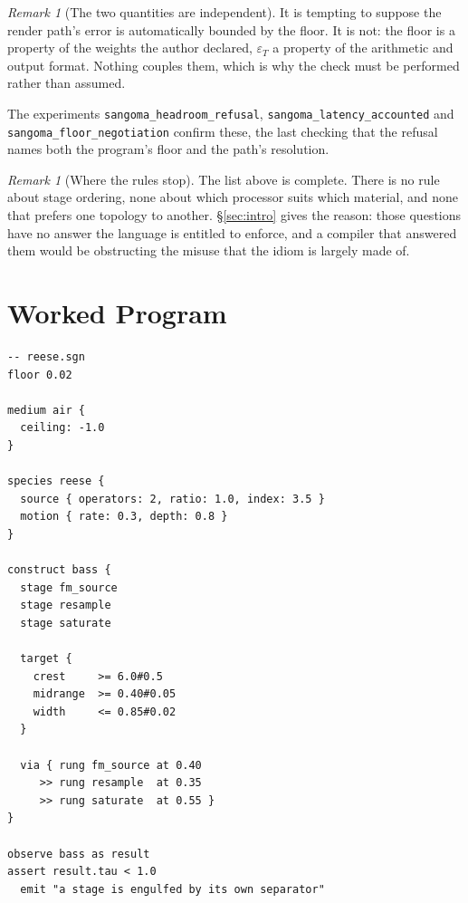 \documentclass[11pt,twocolumn,a4paper]{article}
\theoremstyle{definition}
\theoremstyle{remark}
\newtheorem{remark}[theorem]{Remark}
\begin{document}
\begin{remark}[The two quantities are independent]
\label{rem:indep}
It is tempting to suppose the render path's error is automatically bounded by the
floor. It is not: the floor is a property of the weights the author declared,
$\varepsilon_T$ a property of the arithmetic and output format. Nothing couples
them, which is why the check must be performed rather than assumed.
\end{remark}

The experiments \texttt{sangoma\_headroom\_refusal},
\texttt{sangoma\_latency\_accounted} and \texttt{sangoma\_floor\_negotiation}
confirm these, the last checking that the refusal names both the program's floor
and the path's resolution.

\begin{remark}[Where the rules stop]
\label{rem:rules-stop}
The list above is complete. There is no rule about stage ordering, none about
which processor suits which material, and none that prefers one topology to
another. \S\ref{sec:intro} gives the reason: those questions have no answer the
language is entitled to enforce, and a compiler that answered them would be
obstructing the misuse that the idiom is largely made of.
\end{remark}

\section{Worked Program}
\label{sec:worked}

\begin{lstlisting}[caption={A sangoma program constructing a bass.},label={lst:prog}]
-- reese.sgn
floor 0.02

medium air {
  ceiling: -1.0
}

species reese {
  source { operators: 2, ratio: 1.0, index: 3.5 }
  motion { rate: 0.3, depth: 0.8 }
}

construct bass {
  stage fm_source
  stage resample
  stage saturate

  target {
    crest     >= 6.0#0.5
    midrange  >= 0.40#0.05
    width     <= 0.85#0.02
  }

  via { rung fm_source at 0.40
     >> rung resample  at 0.35
     >> rung saturate  at 0.55 }
}

observe bass as result
assert result.tau < 1.0
  emit "a stage is engulfed by its own separator"
\end{lstlisting}
\end{document}
